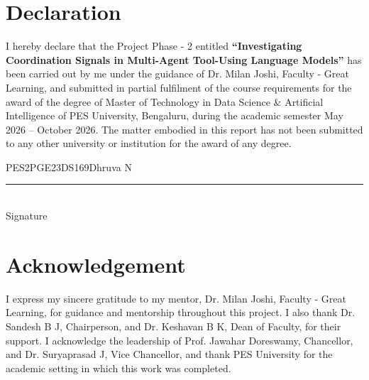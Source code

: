 \documentclass[12pt,a4paper,oneside]{report}
\begin{document}
\chapter*{Declaration}
I hereby declare that the Project Phase - 2 entitled \textbf{``Investigating Coordination Signals in Multi-Agent Tool-Using Language Models''} has been carried out by me under the guidance of Dr. Milan Joshi, Faculty - Great Learning, and submitted in partial fulfilment of the course requirements for the award of the degree of Master of Technology in Data Science \& Artificial Intelligence of PES University, Bengaluru, during the academic semester May 2026 -- October 2026. The matter embodied in this report has not been submitted to any other university or institution for the award of any degree.
\vspace{2cm}
\begin{flushright}
PES2PGE23DS169\hspace{1.5cm}Dhruva N\\[1.2cm]
\rule{0.45\textwidth}{0.4pt}\\Signature
\end{flushright}
\clearpage
\chapter*{Acknowledgement}
I express my sincere gratitude to my mentor, Dr. Milan Joshi, Faculty - Great Learning, for guidance and mentorship throughout this project. I also thank Dr. Sandesh B J, Chairperson, and Dr. Keshavan B K, Dean of Faculty, for their support. I acknowledge the leadership of Prof. Jawahar Doreswamy, Chancellor, and Dr. Suryaprasad J, Vice Chancellor, and thank PES University for the academic setting in which this work was completed.
\clearpage
\end{document}
